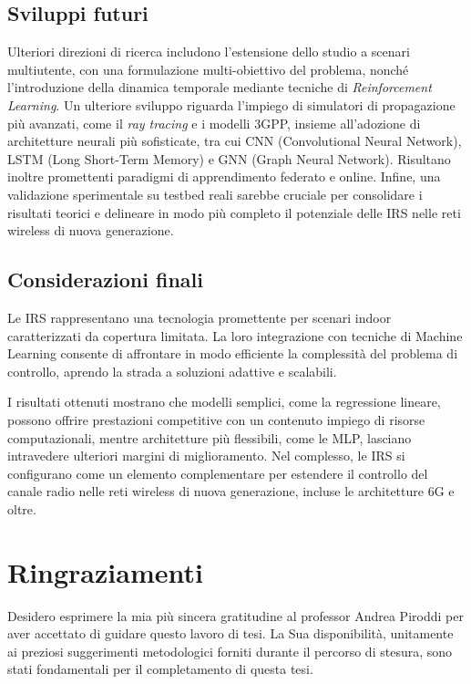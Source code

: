 \documentclass[12pt,a4paper]{report}
\begin{document}
\section{Sviluppi futuri}
Ulteriori direzioni di ricerca includono l'estensione dello studio a
scenari multiutente, con una formulazione multi-obiettivo del
problema, nonché l'introduzione della dinamica temporale mediante
tecniche di \textit{Reinforcement Learning}. Un ulteriore sviluppo
riguarda l'impiego di simulatori di propagazione più avanzati, come
il \textit{ray tracing} e i modelli 3GPP, insieme all'adozione di
architetture neurali più sofisticate, tra cui CNN (Convolutional
Neural Network), LSTM (Long Short-Term Memory) e GNN (Graph Neural
Network). Risultano inoltre promettenti paradigmi di apprendimento
federato e online. Infine, una validazione sperimentale su testbed
reali sarebbe cruciale per consolidare i risultati teorici e
delineare in modo più completo il potenziale delle IRS nelle reti
wireless di nuova generazione.

\newpage
\section{Considerazioni finali}
Le IRS rappresentano una tecnologia promettente per scenari indoor
caratterizzati da copertura limitata. La loro integrazione con
tecniche di Machine Learning consente di affrontare in modo
efficiente la complessità del problema di controllo, aprendo la
strada a soluzioni adattive e scalabili.

I risultati ottenuti mostrano che modelli semplici, come la
regressione lineare, possono offrire prestazioni competitive con un
contenuto impiego di risorse computazionali, mentre architetture più
flessibili, come le MLP, lasciano intravedere ulteriori margini di
miglioramento. Nel complesso, le IRS si configurano come un elemento
complementare per estendere il controllo del canale radio nelle reti
wireless di nuova generazione, incluse le architetture 6G e oltre.

\clearpage{\pagestyle{empty}\cleardoublepage}




\chapter*{Ringraziamenti}
\thispagestyle{empty}
Desidero esprimere la mia più sincera gratitudine al professor Andrea
Piroddi per aver accettato di guidare questo lavoro di tesi. La Sua
disponibilità, unitamente ai preziosi suggerimenti metodologici
forniti durante il percorso di stesura, sono stati fondamentali per
il completamento di questa tesi.
\end{document}
